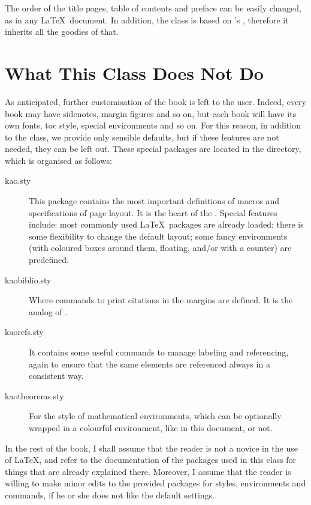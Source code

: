 The order of the title pages, table of contents and preface can be 
easily changed, as in any \LaTeX\ document. In addition, the class is 
based on \KOMAScript's , therefore it inherits all the 
goodies of that.

\section{What This Class Does Not Do}

As anticipated, further customisation of the book is left to the user. 
Indeed, every book may have sidenotes, margin figures and so on, but 
each book will have its own fonts, toc style, special environments and 
so on. For this reason, in addition to the class, we provide only 
sensible defaults, but if these features are not needed, they can be 
left out. These special packages are located in the  
directory, which is organised as follows:

\begin{description}
	\item[kao.sty] This package contains the most important definitions 
    of macros and specifications of page layout. It is the heart of the 
    . Special features include: most commonly used 
    \LaTeX\ packages are already loaded; there is some flexibility to 
    change the default layout; some fancy environments (with coloured 
    boxes around them, floating, and/or with a counter) are predefined.
    \item[kaobiblio.sty] Where commands to print citations in the 
    margins are defined. It is the 
     analog of .
    \item[kaorefs.sty] It contains some useful commands to manage 
    labeling and referencing, again to ensure that the same elements are 
    referenced always in a consistent way.
    \item[kaotheorems.sty] For the style of mathematical environments, 
    which can be optionally wrapped in a colourful  
    environment, like in this document, or not.
\end{description}


In the rest of the book, I shall assume that the reader is not a novice 
in the use of \LaTeX, and refer to the documentation of the packages 
used in this class for things that are already explained there. 
Moreover, I assume that the reader is willing to make minor edits to the 
provided packages for styles, environments and commands, if he or she 
does not like the default settings.

